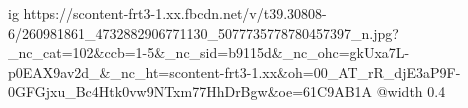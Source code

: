  
 
 
 
 

\ifcmt
  ig https://scontent-frt3-1.xx.fbcdn.net/v/t39.30808-6/260981861_4732882906771130_5077735778780457397_n.jpg?_nc_cat=102&ccb=1-5&_nc_sid=b9115d&_nc_ohc=gkUxa7L-p0EAX9av2d_&_nc_ht=scontent-frt3-1.xx&oh=00_AT_rR_djE3aP9F-0GFGjxu_Bc4Htk0vw9NTxm77HhDrBgw&oe=61C9AB1A
  @width 0.4
\fi
